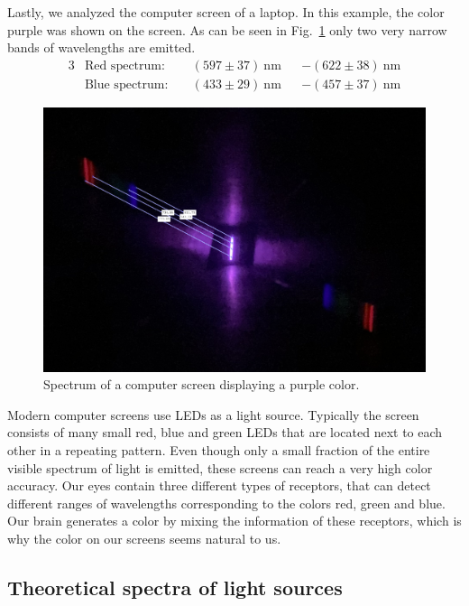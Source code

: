 Lastly, we analyzed the computer screen of a laptop. In this example, the color purple was shown on the screen.
As can be seen in Fig.~\ref{fig_purple_screen} only two very narrow bands of wavelengths are emitted.
\begin{alignat}{3}
    &\text{Red spectrum:} \; &&(597 \pm 37)~\si{\nano\meter} & &- (622 \pm 38)~\si{\nano\meter} \nonumber\\
    &\text{Blue spectrum:} \; &&(433 \pm 29)~\si{\nano\meter} & &- (457 \pm 37)~\si{\nano\meter} \nonumber
\end{alignat}
\begin{figure}[H]
    \centering
    \includegraphics[scale = 0.24]{src/images/purple_screen_meas.png}
    \caption{Spectrum of a computer screen displaying a purple color.}\label{fig_purple_screen}
\end{figure}

Modern computer screens use LEDs as a light source. Typically the screen consists of many small red, blue and 
green LEDs that are located next to each other in a repeating pattern. Even though only a small fraction of 
the entire visible spectrum of light is emitted, these screens can reach a very high color accuracy. Our eyes 
contain three different types of receptors, that can detect different ranges of wavelengths corresponding 
to the colors red, green and blue. Our brain generates a color by mixing the information of these receptors, 
which is why the color on our screens seems natural to us.

\subsection{Theoretical spectra of light sources}

